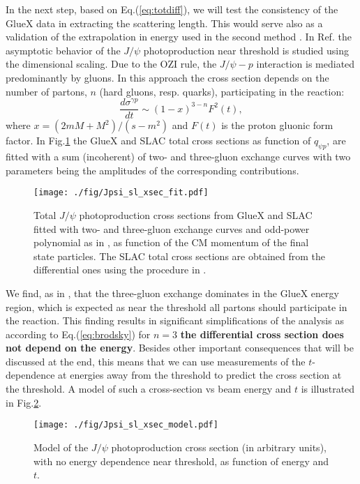 \documentclass[%
preprint,
nofootinbib,
 amsmath,amssymb,
 aps,
floatfix,
]{revtex4-1}
\begin{document}
In the next step, 
based on Eq.(\ref{eq:totdiff}), we will test the consistency 
of the GlueX data in extracting the scattering length.
This would serve also as a validation of the extrapolation in energy used 
in the second method \cite{Strakovsky_jpsi}.
In Ref.\cite{Brodsky} the asymptotic behavior of the $J/\psi $ photoproduction near threshold
is studied using the dimensional scaling.
Due to the OZI rule, the $J/\psi -p$ interaction is mediated predominantly by gluons.
In this approach the cross section depends on the number of partons, $n$ (hard gluons, resp. quarks),
participating in the reaction:
\begin{equation}
\frac{d\sigma^{\gamma p}}{dt} \sim 
(1-x)^{3-n}F^2(t),
\label{eq:brodsky}
\end{equation}
where $x=(2mM+M^2)/(s-m^2)$ and $F(t)$ is the proton gluonic form factor.
In Fig.\ref{fig:xsec_fit} the GlueX \cite{prl_gluex} 
and SLAC \cite{SLAC} total cross sections as function of $q_{\psi p}$,
are fitted with a sum (incoherent)
of two- and three-gluon exchange curves with two parameters being the amplitudes 
of the corresponding contributions.
\begin{figure}[h]
\texttt{[image: ./fig/Jpsi\_sl\_xsec\_fit.pdf]}
  \caption{
Total $J/\psi $ photoproduction cross sections from GlueX \cite{prl_gluex}
and SLAC \cite{SLAC} fitted with two- and three-gluon exchange curves \cite{Brodsky}
and odd-power polynomial as in \cite{Strakovsky_jpsi}, as function of the CM momentum of 
the final state particles.
The SLAC total cross sections are obtained from 
the differential ones using the procedure in \cite{prl_gluex}.
}
  \label{fig:xsec_fit}
\end{figure}
We find, as in \cite{prl_gluex}, that the three-gluon exchange dominates in the GlueX energy region,
which  is expected as near the threshold all partons should participate in the reaction.
This finding results in significant simplifications of the analysis as 
according to Eq.(\ref{eq:brodsky}) for $n=3$ 
{\bf the differential cross section does not depend on the energy}.
Besides other important consequences that will be discussed at the end,
this means that we can use  measurements of the $t$- dependence 
at energies away from the threshold to predict the cross section at the threshold.
A model of such a cross-section vs beam energy and $t$ 
is illustrated in Fig.\ref{fig:xsec_model}.
\begin{figure}
    \texttt{[image: ./fig/Jpsi\_sl\_xsec\_model.pdf]}
    \caption{Model of the $J/\psi $ photoproduction cross section 
(in arbitrary units), 
with no energy dependence near threshold,  as function of energy and $t$.}
    \label{fig:xsec_model}
\end{figure}
\end{document}
